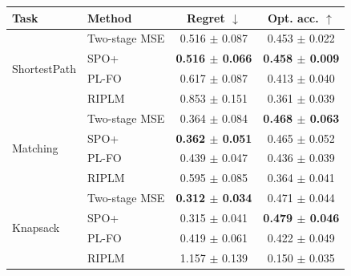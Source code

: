 \begin{tabular}{llcc}
\toprule
Task & Method & Regret $\downarrow$ & Opt. acc. $\uparrow$ \\
\midrule
\multirow{4}{*}{ShortestPath} & Two-stage MSE & 0.516 $\pm$ 0.087 & 0.453 $\pm$ 0.022 \\
 & SPO+ & \textbf{0.516 $\pm$ 0.066} & \textbf{0.458 $\pm$ 0.009} \\
 & PL-FO & 0.617 $\pm$ 0.087 & 0.413 $\pm$ 0.040 \\
 & RIPLM & 0.853 $\pm$ 0.151 & 0.361 $\pm$ 0.039 \\
\midrule
\multirow{4}{*}{Matching} & Two-stage MSE & 0.364 $\pm$ 0.084 & \textbf{0.468 $\pm$ 0.063} \\
 & SPO+ & \textbf{0.362 $\pm$ 0.051} & 0.465 $\pm$ 0.052 \\
 & PL-FO & 0.439 $\pm$ 0.047 & 0.436 $\pm$ 0.039 \\
 & RIPLM & 0.595 $\pm$ 0.085 & 0.364 $\pm$ 0.041 \\
\midrule
\multirow{4}{*}{Knapsack} & Two-stage MSE & \textbf{0.312 $\pm$ 0.034} & 0.471 $\pm$ 0.044 \\
 & SPO+ & 0.315 $\pm$ 0.041 & \textbf{0.479 $\pm$ 0.046} \\
 & PL-FO & 0.419 $\pm$ 0.061 & 0.422 $\pm$ 0.049 \\
 & RIPLM & 1.157 $\pm$ 0.139 & 0.150 $\pm$ 0.035 \\
\bottomrule
\end{tabular}